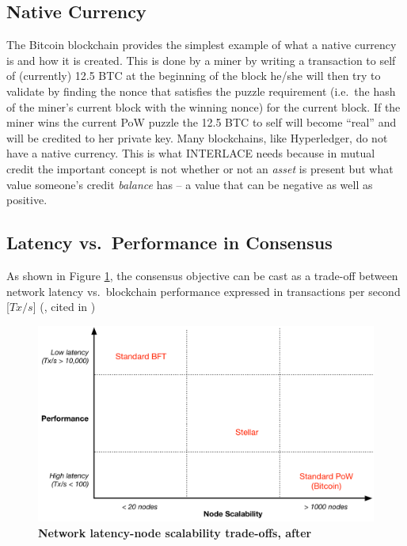 \subsection{Native Currency}
The Bitcoin blockchain provides the simplest example of what a native currency is and how it is created. This is done by a miner by writing a transaction to self of (currently) 12.5 BTC at the beginning of the block he/she will then try to validate by finding the nonce that satisfies the puzzle requirement (i.e.\ the hash of the miner's current block with the winning nonce) for the current block. If the miner wins the current PoW puzzle the 12.5 BTC to self will become ``real'' and will be credited to her private key. Many blockchains, like Hyperledger, do not have a native currency. This is what INTERLACE needs because in mutual credit the important concept is not whether or not an \emph{asset} is present but what value someone's credit \emph{balance} has -- a value that can be negative as well as positive.


\subsection{Latency vs.\ Performance in Consensus}
As shown in Figure \ref{fig:consensus_tradeoffs}, the consensus objective can be cast as a trade-off between network latency vs.\ blockchain performance expressed in transactions per second [$Tx/s$] (\cite{vukolic2015}, cited in \cite{AndroulakiEtAl2018})




\begin{figure}[h]
\centering
\includegraphics[width=14 cm]{Figures/consensus_tradeoffs}
\caption{\bf \small Network latency-node scalability trade-offs, after \cite{vukolic2015}}
\label{fig:consensus_tradeoffs}
\end{figure}









